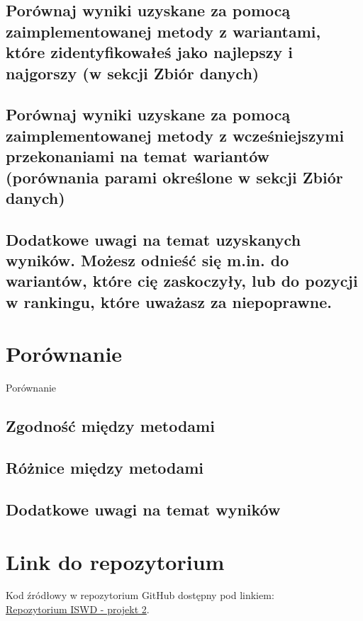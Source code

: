 \documentclass[11pt]{article}
\begin{document}
\subsection{Porównaj wyniki uzyskane za pomocą zaimplementowanej metody z wariantami, które zidentyfikowałeś jako najlepszy i najgorszy (w sekcji Zbiór danych)}

\subsection{Porównaj wyniki uzyskane za pomocą zaimplementowanej metody z wcześniejszymi przekonaniami na temat wariantów (porównania parami określone w sekcji Zbiór danych)}

\subsection{Dodatkowe uwagi na temat uzyskanych wyników. Możesz odnieść się m.in. do wariantów, które cię zaskoczyły, lub do pozycji w rankingu, które uważasz za niepoprawne.}

\section{Porównanie}
Porównanie
\subsection{Zgodność między metodami}

\subsection{Różnice między metodami}

\subsection{Dodatkowe uwagi na temat wyników}


\section{Link do repozytorium}\label{sec:link-do-repo}
Kod źródłowy w repozytorium GitHub dostępny pod linkiem: \\
\href{https://github.com/KotZPolibudy/PUT_ISWD/tree/main/projekt2}{Repozytorium ISWD - projekt 2}.
\end{document}

